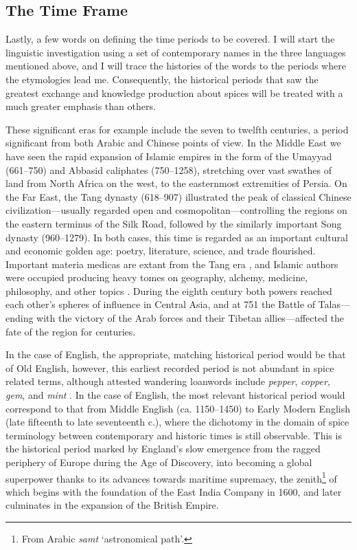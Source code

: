 
\subsection{The Time Frame}

Lastly, a few words on defining the time periods to be covered. I will start the linguistic investigation using a set of contemporary names in the three languages mentioned above, and I will trace the histories of the words to the periods where the etymologies lead me. Consequently, the historical periods that saw the greatest exchange and knowledge production about spices will be treated with a much greater emphasis than others.

These significant eras for example include the seven to twelfth centuries, a period significant from both Arabic and Chinese points of view. In the Middle East we have seen the rapid expansion of Islamic empires in the form of the Umayyad (661--750) and Abbasid caliphates (750--1258), stretching over vast swathes of land from North Africa on the west, to the easternmost extremities of Persia. On the Far East, the Tang dynasty (618--907) illustrated the peak of classical Chinese civilization---usually regarded open and cosmopolitan---controlling the regions on the eastern terminus of the Silk Road, followed by the similarly important Song dynasty (960--1279). In both cases, this time is regarded as an important cultural and economic golden age: poetry, literature, science, and trade flourished. Important \glspl{materia medica} are extant from the Tang era \autocite{wu_illustrated_2005}, and Islamic authors were occupied producing heavy tomes on geography, alchemy, medicine, philosophy, and other topics \autocite[131]{meri_medieval_2006}. During the eighth century both powers reached each other's spheres of influence in Central Asia, and at 751 the Battle of Talas---ending with the victory of the Arab forces and their Tibetan allies---affected the fate of the region for centuries. 

In the case of English, the appropriate, matching historical period would be that of Old English, however, this earliest recorded period is not abundant in spice related terms, although attested wandering loanwords include \textit{pepper}, \textit{copper}, \textit{gem}, and \textit{mint} \autocite{wollman_early_1993}. In the case of English, the most relevant historical period would correspond to that from Middle English (ca. 1150--1450) to Early Modern English (late fifteenth to late seventeenth c.), where the dichotomy in the domain of spice terminology between contemporary and historic times is still observable. This is the historical period marked by England's slow emergence from the ragged periphery of Europe during the Age of Discovery, into becoming a global superpower thanks to its advances towards maritime supremacy, the zenith\footnote{From Arabic \textit{samt} `astronomical path'.} of which begins with the foundation of the East India Company in 1600, and later culminates in the expansion of the British Empire.

